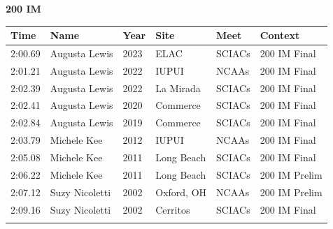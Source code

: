 \vspace{1.2em}
\noindent\begin{minipage}[t]{0.98\textwidth}
\centering
\textbf{\textcolor{teamprimary}{200 IM}}\par
\vspace{0.5em}
\centering
\small
\renewcommand{\arraystretch}{1.0}
\setlength{\tabcolsep}{4pt}
\begin{tabular}{@{}p{2.0cm}p{3.2cm}p{1.2cm}p{2.0cm}p{2.0cm}p{2.5cm}@{}}
\toprule
\textbf{Time} & \textbf{Name} & \textbf{Year} & \textbf{Site} & \textbf{Meet} & \textbf{Context} \\
\midrule
2:00.69 & Augusta Lewis & 2023 & ELAC & SCIACs & 200 IM Final \\
2:01.21 & Augusta Lewis & 2022 & IUPUI & NCAAs & 200 IM Final \\
2:02.39 & Augusta Lewis & 2022 & La Mirada & SCIACs & 200 IM Final \\
2:02.41 & Augusta Lewis & 2020 & Commerce & SCIACs & 200 IM Final \\
2:02.84 & Augusta Lewis & 2019 & Commerce & SCIACs & 200 IM Final \\
2:03.79 & Michele Kee & 2012 & IUPUI & NCAAs & 200 IM Final \\
2:05.08 & Michele Kee & 2011 & Long Beach & SCIACs & 200 IM Final \\
2:06.22 & Michele Kee & 2011 & Long Beach & SCIACs & 200 IM Prelim \\
2:07.12 & Suzy Nicoletti & 2002 & Oxford, OH & NCAAs & 200 IM Prelim \\
2:09.16 & Suzy Nicoletti & 2002 & Cerritos & SCIACs & 200 IM Final \\
\bottomrule
\vspace{0.5em}
\end{tabular}
\end{minipage}
\vspace{1.2em}
